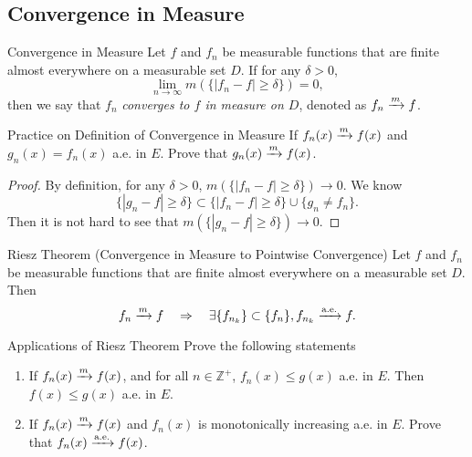 \subsection{Convergence in Measure}

\begin{definition}{Convergence in Measure}{}
  Let $f$ and $f_n$ be measurable functions that are finite almost everywhere on
  a measurable set $D$. If for any $\delta > 0$,
  \begin{equation}
    \lim \limits _{n \rightarrow \infty} m(\{|f_n - f| \geq \delta\}) = 0,
  \end{equation}
  then we say that $f_n$ \emph{converges to $f$ in measure on $D$},
  denoted as $f_n \xrightarrow{m} f$.
\end{definition}

\begin{example}{Practice on Definition of Convergence in Measure}{}
  If $f_n(x) \xrightarrow{m} f(x)$ and $g_n(x) = f_n(x)$ a.e. in $E$.
  Prove that $g_n(x) \xrightarrow{m} f(x)$.
\end{example}

\begin{proof}
  By definition, for any $\delta > 0$, $m(\{|f_n - f| \geq \delta\}) \rightarrow 0$.
  We know
  \begin{equation}
    \{|g_n - f| \geq \delta \} \subset \{|f_n - f| \geq \delta\} \cup \{g_n \neq f_n\}.
  \end{equation}
  Then it is not hard to see that $m(\{|g_n - f| \geq \delta\}) \rightarrow 0$.
\end{proof}

\begin{theorem}{Riesz Theorem (Convergence in Measure to Pointwise Convergence)}{}
  Let $f$ and $f_n$ be measurable functions that are finite almost everywhere on
  a measurable set $D$. Then
  \begin{equation}
    f_n \xrightarrow{m} f \quad \Rightarrow \quad \exists \{f_{n_k}\} \subset \{f_n\}, f_{n_k} \xrightarrow{\text{a.e.}} f.
  \end{equation}
\end{theorem}

\begin{example}{Applications of Riesz Theorem}{}
  Prove the following statements
  \begin{enumerate}
  \item If $f_n(x) \xrightarrow{m} f(x)$, and for all $n \in \mathbb{Z}^+$, $f_n(x) \leq g(x)$ a.e. in $E$.
    Then $f(x) \leq g(x)$ a.e. in $E$.
  \item If $f_n(x) \xrightarrow{m} f(x)$ and $f_n(x)$ is monotonically increasing a.e. in $E$.
    Prove that $f_n(x) \xrightarrow{\text{a.e.}} f(x)$.
  \end{enumerate}
\end{example}


